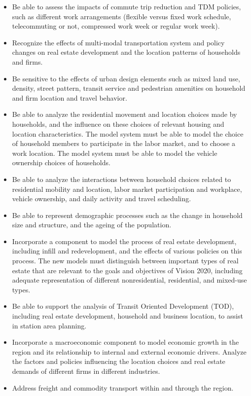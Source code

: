 \begin{itemize}
\item   Be able to assess the impacts of commute trip reduction and TDM policies, such as different work arrangements (flexible versus fixed work schedule, telecommuting or not, compressed work week or regular work week).
\item   Recognize the effects of multi-modal transportation system and policy changes on real estate development and the location patterns of households and firms.
\item   Be sensitive to the effects of urban design elements such as mixed land use, density, street pattern, transit service and pedestrian amenities on household and firm location and travel behavior.
\item   Be able to analyze the residential movement and location choices made by households, and the influence on these choices of relevant housing and location characteristics.  The model system must be able to model the choice of household members to participate in the labor market, and to choose a work location.  The model system must be able to model the vehicle ownership choices of households.
\item   Be able to analyze the interactions between household choices related to residential mobility and location, labor market participation and workplace, vehicle ownership, and daily activity and travel scheduling.
\item   Be able to represent demographic processes such as the change in household size and structure, and the ageing of the population.
\item   Incorporate a component to model the process of real estate development, including infill and redevelopment, and the effects of various policies on this process.  The new models must distinguish between important types of real estate that are relevant to the goals and objectives of Vision 2020, including adequate representation of different nonresidential, residential, and mixed-use types.
\item   Be able to support the analysis of Transit Oriented Development (TOD), including real estate development, household and business location, to assist in station area planning.
\item   Incorporate a macroeconomic component to model economic growth in the region and its relationship to internal and external economic drivers.  Analyze the factors and policies influencing the location choices and real estate demands of different firms in different industries.
\item   Address freight and commodity transport within and through the region.

\end{itemize}

